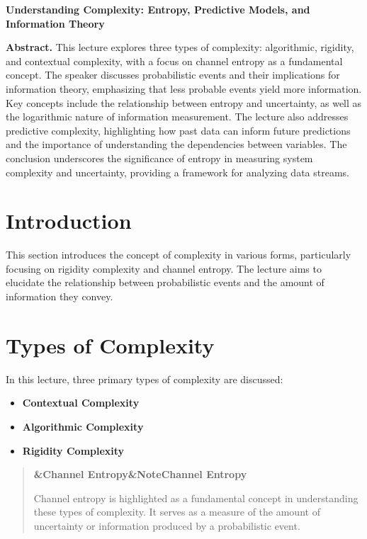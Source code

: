 \documentclass[a4paper]{article}
\newcommand{\boxheading}[1]{%
  \par\smallskip
  \noindent\textbf{\ifx&#1&Note\else#1\fi}\par
  \smallskip
}
\newenvironment{rembox}[1][]{%
  \begin{quote}\color{black!70}\boxheading{#1}\normalcolor
}{\end{quote}}
\begin{document}
\begin{center}
{\LARGE \textbf{Understanding Complexity: Entropy, Predictive Models, and Information Theory}}\\[1em]
\end{center}

\textbf{Abstract.} This lecture explores three types of complexity: algorithmic, rigidity, and contextual complexity, with a focus on channel entropy as a fundamental concept. The speaker discusses probabilistic events and their implications for information theory, emphasizing that less probable events yield more information. Key concepts include the relationship between entropy and uncertainty, as well as the logarithmic nature of information measurement. The lecture also addresses predictive complexity, highlighting how past data can inform future predictions and the importance of understanding the dependencies between variables. The conclusion underscores the significance of entropy in measuring system complexity and uncertainty, providing a framework for analyzing data streams.

\section{Introduction}
This section introduces the concept of complexity in various forms, particularly focusing on rigidity complexity and channel entropy. The lecture aims to elucidate the relationship between probabilistic events and the amount of information they convey.

\section{Types of Complexity}
In this lecture, three primary types of complexity are discussed:
\begin{itemize}
    \item \textbf{Contextual Complexity}
    \item \textbf{Algorithmic Complexity}
    \item \textbf{Rigidity Complexity}
\end{itemize}

\begin{rembox}[Channel Entropy]
Channel entropy is highlighted as a fundamental concept in understanding these types of complexity. It serves as a measure of the amount of uncertainty or information produced by a probabilistic event.
\end{rembox}
\end{document}

